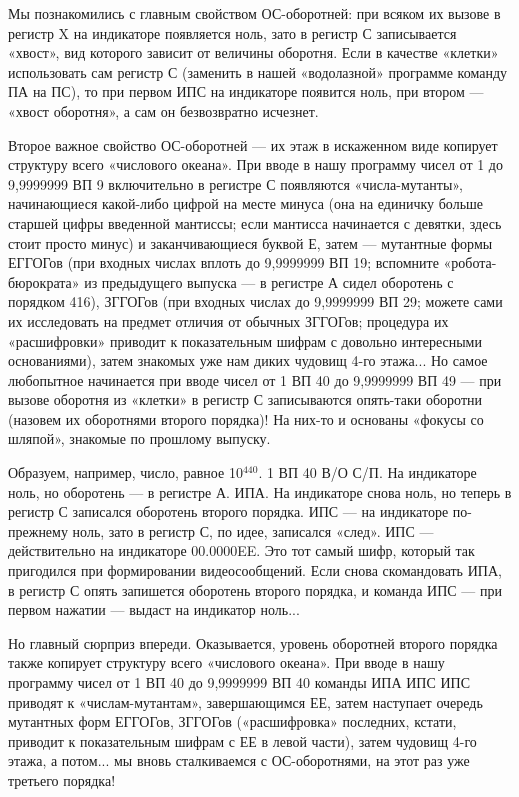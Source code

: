 \documentclass[11pt,a4paper,oneside]{article}
\begin{document}
Мы познакомились с главным свойством ОС-оборотней: при всяком их вызове в регистр X на индикаторе появляется ноль, зато в регистр С записывается «хвост», вид которого зависит от величины оборотня. Если в качестве «клетки» использовать сам регистр С (заменить в нашей «водолазной» программе команду ПА на ПС), то при первом ИПС на индикаторе появится ноль, при втором — «хвост оборотня», а сам он безвозвратно исчезнет.

Второе важное свойство ОС-оборотней — их этаж в искаженном виде копирует структуру всего «числового океана». При вводе в нашу программу чисел от 1 до 9,9999999 ВП 9 включительно в регистре С появляются «числа-мутанты», начинающиеся какой-либо цифрой на месте минуса (она на единичку больше старшей цифры введенной мантиссы; если мантисса начинается с девятки, здесь стоит просто минус) и заканчивающиеся буквой Е, затем — мутантные формы ЕГГОГов (при входных числах вплоть до 9,9999999 ВП 19; вспомните «робота-бюрократа» из предыдущего выпуска — в регистре А сидел оборотень с порядком 416), ЗГГОГов (при входных числах до 9,9999999 ВП 29; можете сами их исследовать на предмет отличия от обычных ЗГГОГов; процедура их «расшифровки» приводит к показательным шифрам с довольно интересными основаниями), затем знакомых уже нам диких чудовищ 4-го этажа... Но самое любопытное начинается при вводе чисел от 1 ВП 40 до 9,9999999 ВП 49 — при вызове оборотня из «клетки» в регистр С записываются опять-таки оборотни (назовем их оборотнями второго порядка)! На них-то и основаны «фокусы со шляпой», знакомые по прошлому выпуску.

Образуем, например, число, равное 10$^{440}$. 1 ВП 40 В/О С/П. На индикаторе ноль, но оборотень — в регистре А. ИПА. На индикаторе снова ноль, но теперь в регистр С записался оборотень второго порядка. ИПС — на индикаторе по-прежнему ноль, зато в регистр С, по идее, записался «след». ИПС — действительно на индикаторе 00.0000EE. Это тот самый шифр, который так пригодился при формировании видеосообщений. Если снова скомандовать ИПА, в регистр С опять запишется оборотень второго порядка, и команда ИПС — при первом нажатии — выдаст на индикатор ноль...

Но главный сюрприз впереди. Оказывается, уровень оборотней второго порядка также копирует структуру всего «числового океана». При вводе в нашу программу чисел от 1 ВП 40 до 9,9999999 ВП 40 команды ИПА ИПС ИПС приводят к «числам-мутантам», завершающимся ЕЕ, затем наступает очередь мутантных форм ЕГГОГов, ЗГГОГов («расшифровка» последних, кстати, приводит к показательным шифрам с ЕЕ в левой части), затем чудовищ 4-го этажа, а потом... мы вновь сталкиваемся с ОС-оборотнями, на этот раз уже третьего порядка!
\end{document}
